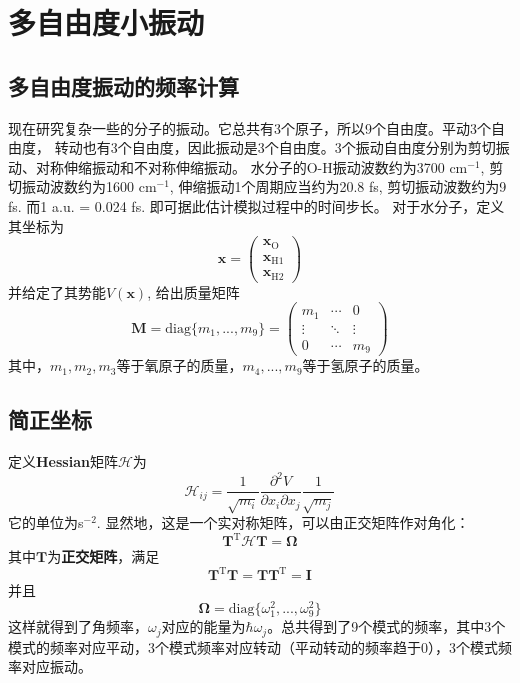 \chapter{多自由度小振动}

    \section{多自由度振动的频率计算}
    现在研究复杂一些的分子的振动。它总共有3个原子，所以9个自由度。平动3个自由度，
    转动也有3个自由度，因此振动是3个自由度。3个振动自由度分别为剪切振动、对称伸缩振动和不对称伸缩振动。
    水分子的O-H振动波数约为3700 cm$^{-1}$, 剪切振动波数约为1600 cm$^{-1}$, 
    伸缩振动1个周期应当约为20.8 fs, 剪切振动波数约为9 fs. 而1 a.u. = 0.024 fs.
    即可据此估计模拟过程中的时间步长。
    对于水分子，定义其坐标为
    \begin{equation*}
        \bm{x} = 
        \begin{pmatrix}
            \bm{x}_\mathrm{O}\\
            \bm{x}_{\mathrm{H1}}\\
            \bm{x}_{\mathrm{H2}}
        \end{pmatrix}
    \end{equation*}
    并给定了其势能$V(\bm{x})$, 给出质量矩阵
    \begin{equation*}
        \bm{M} = \mathrm{diag} \{m_1,...,m_9 \} = 
        \begin{pmatrix}
            m_1 & \cdots & 0\\
            \vdots & \ddots & \vdots\\
            0 & \cdots & m_9
        \end{pmatrix}
    \end{equation*}
    其中，$m_1,m_2,m_3$等于氧原子的质量，$m_4,...,m_9$等于氢原子的质量。

    \section{简正坐标}
    定义\textbf{Hessian}矩阵$\bm{\mathcal{H}}$为 
    \begin{equation*}
        \bm{\mathcal{H}}_{ij} = \frac 1{\sqrt{m_i}} \frac {\partial^2 V}{\partial x_i \partial x_j} \frac 1{\sqrt{m_j}}
    \end{equation*}
    它的单位为s$^{-2}$. 显然地，这是一个实对称矩阵，可以由正交矩阵作对角化：
    \begin{equation*}
        \bm{T}^\mathrm{T} \bm{\mathcal{H}T = \Omega}
    \end{equation*}
    其中$\bm{T}$为\textbf{正交矩阵}，满足 
    \begin{equation*}
        \bm{T}^\mathrm{T}\bm{T} = \bm{TT}^\mathrm{T} = \bm{I}
    \end{equation*}
    并且
    \begin{equation*}
        \bm{\Omega} = \mathrm{diag} \{\omega_1^2, ..., \omega_9^2 \}
    \end{equation*}
    这样就得到了角频率，$\omega_j$对应的能量为$\hbar \omega_j$。总共得到了9个模式的频率，其中3个模式的频率对应平动，3个模式频率对应转动（平动转动的频率趋于0），3个模式频率对应振动。

